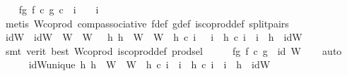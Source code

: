 \begin{isabellebody}
\ \ \isamarkupfalse%
\ fg{}{\isacharcolon}{\kern0pt}\ {\isachardoublequoteopen}{\isacharparenleft}{\kern0pt}f\ {\isasymcirc}\isactrlsub c\ g{\isacharparenright}{\kern0pt}\ {\isasymcirc}\isactrlsub c\ \ i\ \ \ {\isacharequal}{\kern0pt}\ i\isanewline
\ \ \ \ \isamarkupfalse%
\ {\isacharparenleft}{\kern0pt}metis\ W{\isacharunderscore}{\kern0pt}coprod\ comp{\isacharunderscore}{\kern0pt}associative{}\ f{\isacharunderscore}{\kern0pt}def\ g{\isacharunderscore}{\kern0pt}def\ is{\isacharunderscore}{\kern0pt}coprod{\isacharunderscore}{\kern0pt}def\ split{\isacharunderscore}{\kern0pt}pairs{\isacharparenright}{\kern0pt}\isanewline
\ \ \ \ \isanewline
\ \ \isamarkupfalse%
\ idW\ \ {\isachardoublequoteopen}idW\ {\isacharcolon}{\kern0pt}\ W\ {\isasymrightarrow}\ W\ {\isasymand}\ {\isacharparenleft}{\kern0pt}{\isasymforall}\ h{}{\isachardot}{\kern0pt}\ {\isacharparenleft}{\kern0pt}h{}\ {\isacharcolon}{\kern0pt}\ W\ {\isasymrightarrow}\ W\ {\isasymand}\ h{}\ {\isasymcirc}\isactrlsub c\ i\ \ {\isacharequal}{\kern0pt}\ i\ {\isasymand}\ h{}\ {\isasymcirc}\isactrlsub c\ i\ {\isacharequal}{\kern0pt}\ i\ {\isasymlongrightarrow}\ h{}\ {\isacharequal}{\kern0pt}\ idW{\isacharparenright}{\kern0pt}{\isachardoublequoteclose}\isanewline
\ \ \ \ \isamarkupfalse%
\ {\isacharparenleft}{\kern0pt}smt\ {\isacharparenleft}{\kern0pt}verit{\isacharcomma}{\kern0pt}\ best{\isacharparenright}{\kern0pt}\ W{\isacharunderscore}{\kern0pt}coprod\ is{\isacharunderscore}{\kern0pt}coprod{\isacharunderscore}{\kern0pt}def\ prod{\isachardot}{\kern0pt}sel{\isacharparenright}{\kern0pt}\isanewline
\ \ \isamarkupfalse%
\ \isamarkupfalse%
\ fg{\isacharcolon}{\kern0pt}\ {\isachardoublequoteopen}f\ {\isasymcirc}\isactrlsub c\ g\ {\isacharequal}{\kern0pt}\ id\ W{\isachardoublequoteclose}\isanewline
\ \ \isamarkupfalse%
\ auto\isanewline
\ \ \ \ \isamarkupfalse%
\ idW{\isacharunderscore}{\kern0pt}unique{\isacharcolon}{\kern0pt}\ {\isachardoublequoteopen}{\isasymforall}h{}{\isachardot}{\kern0pt}\ h{}\ {\isacharcolon}{\kern0pt}\ W\ {\isasymrightarrow}\ W\ {\isasymand}\ h{}\ {\isasymcirc}\isactrlsub c\ i\ {\isacharequal}{\kern0pt}\ i\ {\isasymand}\ h{}\ {\isasymcirc}\isactrlsub c\ i\ {\isacharequal}{\kern0pt}\ i\ {\isasymlongrightarrow}\ h{}\ {\isacharequal}{\kern0pt}\ idW{\isachardoublequoteclose}\isanewline

\end{isabellebody}
